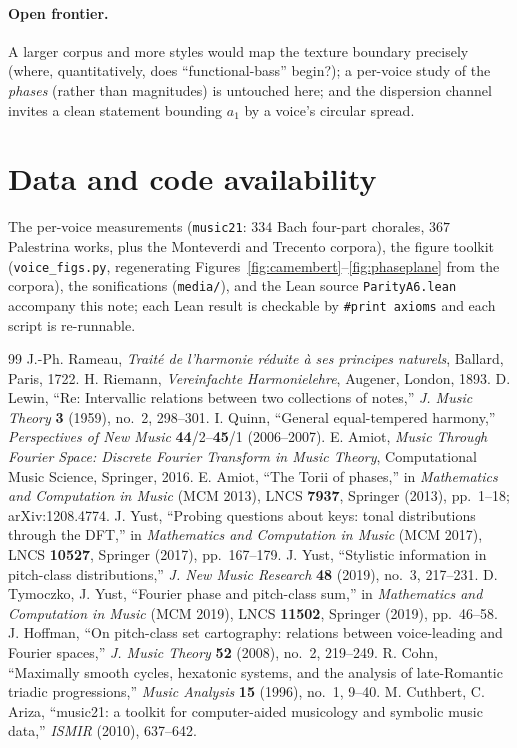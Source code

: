 \documentclass[11pt]{article}
\newcommand{\lean}[1]{\texttt{#1}}
\begin{document}
\paragraph{Open frontier.} A larger corpus and more styles would map the texture boundary precisely (where,
quantitatively, does ``functional-bass'' begin?); a per-voice study of the \emph{phases} (rather than
magnitudes) is untouched here; and the dispersion channel invites a clean statement bounding $a_1$ by a
voice's circular spread.

\section*{Data and code availability}
The per-voice measurements (\lean{music21}: $334$ Bach four-part chorales, $367$ Palestrina works, plus the
Monteverdi and Trecento corpora), the figure toolkit (\lean{voice\_figs.py}, regenerating
Figures~\ref{fig:camembert}--\ref{fig:phaseplane} from the corpora), the sonifications
(\lean{media/}), and the Lean source \lean{ParityA6.lean} accompany this note; each Lean result
is checkable by \lean{\#print axioms} and each script is re-runnable.

\begin{thebibliography}{99}
 J.-Ph. Rameau, \emph{Trait\'e de l'harmonie r\'eduite \`a ses principes naturels},
  Ballard, Paris, 1722.
 H. Riemann, \emph{Vereinfachte Harmonielehre}, Augener, London, 1893.
 D. Lewin, ``Re: Intervallic relations between two collections of notes,''
  \emph{J. Music Theory} \textbf{3} (1959), no.~2, 298--301.
 I. Quinn, ``General equal-tempered harmony,'' \emph{Perspectives of New Music}
  \textbf{44}/2--\textbf{45}/1 (2006--2007).
 E. Amiot, \emph{Music Through Fourier Space: Discrete Fourier Transform in Music Theory},
  Computational Music Science, Springer, 2016.
 E. Amiot, ``The Torii of phases,'' in \emph{Mathematics and Computation in Music}
  (MCM 2013), LNCS \textbf{7937}, Springer (2013), pp.~1--18; arXiv:1208.4774.
 J. Yust, ``Probing questions about keys: tonal distributions through the DFT,'' in
  \emph{Mathematics and Computation in Music} (MCM 2017), LNCS \textbf{10527}, Springer (2017),
  pp.~167--179.
 J. Yust, ``Stylistic information in pitch-class distributions,'' \emph{J. New Music
  Research} \textbf{48} (2019), no.~3, 217--231.
 D. Tymoczko, J. Yust, ``Fourier phase and pitch-class sum,'' in \emph{Mathematics and
  Computation in Music} (MCM 2019), LNCS \textbf{11502}, Springer (2019), pp.~46--58.
 J. Hoffman, ``On pitch-class set cartography: relations between voice-leading and
  Fourier spaces,'' \emph{J. Music Theory} \textbf{52} (2008), no.~2, 219--249.
 R. Cohn, ``Maximally smooth cycles, hexatonic systems, and the analysis of late-Romantic
  triadic progressions,'' \emph{Music Analysis} \textbf{15} (1996), no.~1, 9--40.
 M. Cuthbert, C. Ariza, ``music21: a toolkit for computer-aided musicology and symbolic music
  data,'' \emph{ISMIR} (2010), 637--642.
\end{thebibliography}
\end{document}
